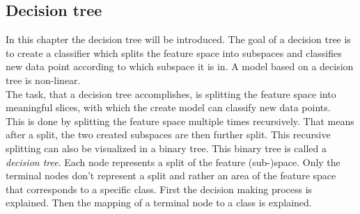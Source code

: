 \subsection{Decision tree}

In this chapter the decision tree will be introduced. The goal of a decision tree is to create a classifier which splits the feature space into subspaces and classifies new data point according to which subspace it is in. A model based on a decision tree is non-linear.
\\

The task, that a decision tree accomplishes, is splitting the feature space into meaningful slices, with which the create model can classify new data points.
\\
This is done by splitting the feature space multiple times recursively. That means after a split, the two created subspaces are then further split. This recursive splitting can also be visualized in a binary tree. This binary tree is called a \emph{decision tree}. Each node represents a split of the feature (sub-)space.  Only the terminal nodes don't represent a split and rather an area of the feature space that corresponds to a specific class. First the decision making process is explained. Then the mapping of a terminal node to a class is explained.
\\

